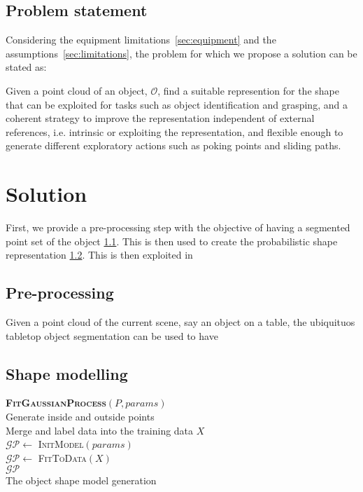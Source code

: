 \documentclass[twocolumn,draft,natbib]{svjour3}
\begin{document}
\subsection{Problem statement}
\label{sec:problem}

Considering the equipment limitations~\ref{sec:equipment} and the assumptions~\ref{sec:limitations}, the problem for which we propose a solution can be stated as:

Given a point cloud of an object, $\mathcal{O}$, find a suitable represention for the shape that can be exploited for tasks such as object identification and grasping, and a coherent strategy to improve the representation independent of external references, i.e. intrinsic or exploiting the representation, and flexible enough to generate different exploratory actions such as poking points and sliding paths.

\section{Solution}
\label{sec:solution}

First, we provide a pre-processing step with the objective of having a segmented point set of the object \ref{sec:pre}. This is then used to create the probabilistic shape representation \ref{sec:object}. This is then exploited in 

\subsection{Pre-processing}
\label{sec:pre}

Given a point cloud of the current scene, say an object on a table, the ubiquituos tabletop object segmentation 
\citep{TabletopObjectDetector} can be used to have 

\subsection{Shape modelling}
\label{sec:object}

\begin{algorithm}[h]
\textbf{\textsc{FitGaussianProcess}}$(P, params)$\\ %
\LinesNumbered
\DontPrintSemicolon
\SetAlgoVlined {} 
  Generate inside and outside points \\
  Merge and label data into the training data $X$ \\
  $\mathcal{GP} \leftarrow$ \textsc{InitModel}$(params)$ \\
  $\mathcal{GP} \leftarrow$ \textsc{FitToData}$(X)$ \\
  \Return $\mathcal{GP}$ \\
\caption{The object shape model generation} \label{algo:strategy}
\end{algorithm}
\end{document}
